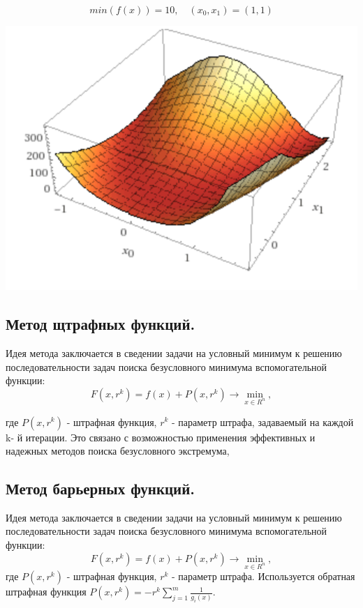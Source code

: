 \documentclass[a4paper, 12pt]{article}   	%
\begin{document}
     \begin{equation}
        min(f(x)) = 10,\quad (x_0, x_1) = (1, 1)
    \end{equation}
    
    \begin{center}
        \begin{minipage}{0.7\linewidth}
            \includegraphics[width=\linewidth]{img/function}
        \end{minipage}
    \end{center}
    
\subsection{Метод щтрафных функций.}
    Идея метода заключается в сведении задачи на условный минимум к решению последовательности задач поиска безусловного минимума вспомогательной функции: 
    \begin{equation}
        F(x, r^k) = f(x) + P(x, r^k) \rightarrow \min_{x \in R^n},
    \end{equation}

    где $P(x, r^k)$ -  штрафная функция, $r^k$ - параметр штрафа, задаваемый на каждой k- й итерации. Это связано с возможностью применения эффективных и надежных методов поиска безусловного экстремума,
    
\subsection{Метод барьерных функций.}
    Идея метода заключается в сведении задачи на условный минимум к решению последовательности задач поиска безусловного минимума вспомогательной функции: 
    \begin{equation}
        F(x, r^k) = f(x) + P(x, r^k) \rightarrow \min_{x \in R^n},
    \end{equation}
    где $P(x, r^k)$ -  штрафная функция, $r^k$ - параметр штрафа. Используется обратная штрафная функция $P(x, r^k) = -r^k \sum_{j=1}^m \frac{1}{g_i(x)}$.
\end{document}

